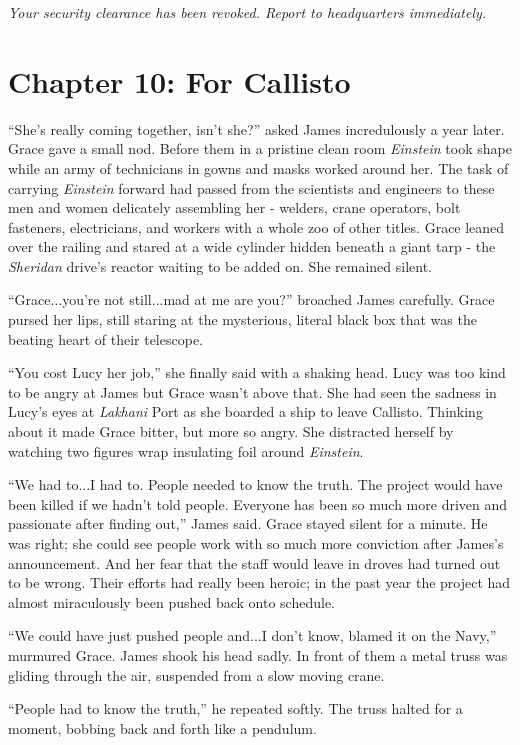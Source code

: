 \documentclass[12pt]{article} %
\begin{document}
\textit{Your security clearance has been revoked. Report to headquarters immediately.}

\newpage
\section{Chapter 10: For Callisto}

``She's really coming together, isn't she?'' asked James incredulously a year later. Grace gave a small nod. Before them in a pristine clean room \textit{Einstein} took shape while an army of technicians in gowns and masks worked around her. The task of carrying \textit{Einstein} forward had passed from the scientists and engineers to these men and women delicately assembling her - welders, crane operators, bolt fasteners, electricians, and workers with a whole zoo of other titles. Grace leaned over the railing and stared at a wide cylinder hidden beneath a giant tarp - the \textit{Sheridan} drive's reactor waiting to be added on. She remained silent.

``Grace...you're not still...mad at me are you?'' broached James carefully. Grace pursed her lips, still staring at the mysterious, literal black box that was the beating heart of their telescope.

``You cost Lucy her job,'' she finally said with a shaking head. Lucy was too kind to be angry at James but Grace wasn't above that. She had seen the sadness in Lucy's eyes at \textit{Lakhani} Port as she boarded a ship to leave Callisto. Thinking about it made Grace bitter, but more so angry. She distracted herself by watching two figures wrap insulating foil around \textit{Einstein}.

``We had to...I had to. People needed to know the truth. The project would have been killed if we hadn't told people. Everyone has been so much more driven and passionate after finding out,'' James said. Grace stayed silent for a minute. He was right; she could see people work with so much more conviction after James's announcement. And her fear that the staff would leave in droves had turned out to be wrong. Their efforts had really been heroic; in the past year the project had almost miraculously been pushed back onto schedule.

``We could have just pushed people and...I don't know, blamed it on the Navy,'' murmured Grace. James shook his head sadly. In front of them a metal truss was gliding through the air, suspended from a slow moving crane.

``People had to know the truth,'' he repeated softly. The truss halted for a moment, bobbing back and forth like a pendulum.
\end{document}
